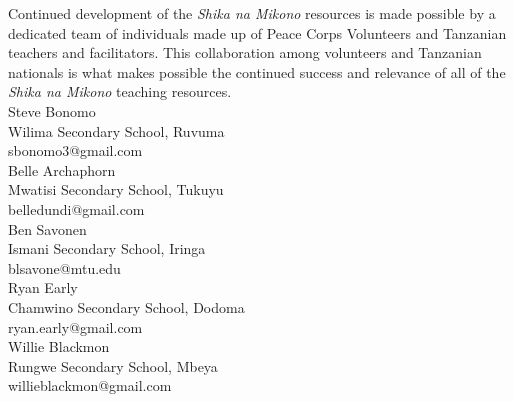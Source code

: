 Continued development of the \emph{Shika na Mikono} resources is made possible by a dedicated team of individuals made up of Peace Corps Volunteers and Tanzanian teachers and facilitators. This collaboration among volunteers and Tanzanian nationals is what makes possible the continued success and relevance of all of the \emph{Shika na Mikono} teaching resources.\\[24pt]
Steve Bonomo\\
Wilima Secondary School, Ruvuma\\
sbonomo3@gmail.com\\[12pt]
Belle Archaphorn\\
Mwatisi Secondary School, Tukuyu\\
belledundi@gmail.com\\[12pt]
Ben Savonen\\
Ismani Secondary School, Iringa\\
blsavone@mtu.edu\\[12pt]
Ryan Early\\
Chamwino Secondary School, Dodoma\\
ryan.early@gmail.com\\[12pt]
Willie Blackmon\\
Rungwe Secondary School, Mbeya\\
willieblackmon@gmail.com




